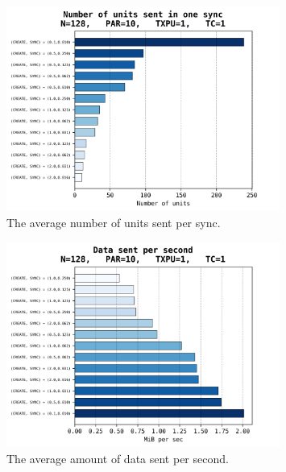 \documentclass[a4paper,10pt]{article}
\begin{document}
			\begin{figure}[h]
				\centering
				\includegraphics[width=0.8\textwidth]{bar_plots/final_exp1/units_sent_sync.png}
				\caption{The average number of units sent per sync.}
				\label{fig:delaysUnitsPerSync}
			\end{figure}
			\begin{figure}[h]
				\centering
				\includegraphics[width=0.8\textwidth]{bar_plots/final_exp1/bytes_sent_per_sec.png}
				\caption{The average amount of data sent per second.}
				\label{fig:delaysBps}
			\end{figure}
		\FloatBarrier
\end{document}
